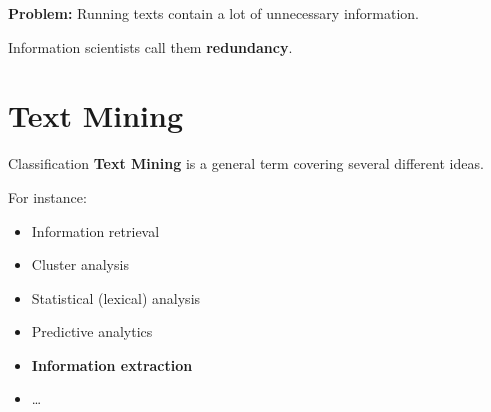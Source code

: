 \documentclass[xcolor=x11names, aspectratio=169]{beamer}
\begin{document}
\begin{frame}\begin{center}
\textbf{Problem:}
Running texts contain \alert{a lot} of unnecessary information.

Information scientists call them \textbf{redundancy}.
\end{center}
\end{frame}


\section{Text Mining}%

\begin{frame}{Classification}
\textbf{Text Mining} is a \alert{general term} covering several different ideas.\pause

For instance:
\begin{itemize}[<+->]
\item Information retrieval
\item Cluster analysis
\item Statistical (lexical) analysis
\item Predictive analytics
\item \textbf{Information extraction}
\item\dots
\end{itemize}
\end{frame}



\maketitle
\end{document}
